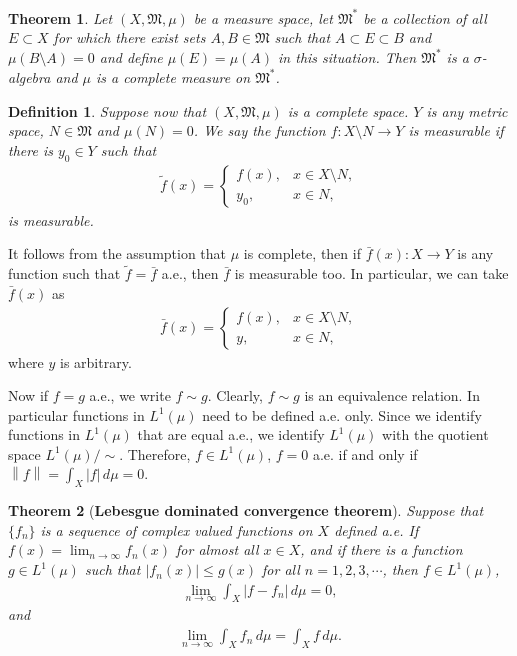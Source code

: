 \documentclass[11pt]{book}
\newtheorem{definition}{Definition}[chapter]
\newtheorem{theorem}{Theorem}[chapter]
\theoremstyle{definition}
\numberwithin{equation}{chapter}
\begin{document}
\medskip

\begin{theorem}{\rm \cite{2}}\label{theorem_218}
Let $(X,\mathfrak{M},\mu)$ be a measure space, let $\mathfrak{M}^*$ be a collection of all $E \subset X$ for which there exist sets $A, B \in \mathfrak{M}$ such that $A \subset E \subset B$ and $\mu(B\setminus A) = 0$ and define $\mu(E) = \mu(A)$ in this situation. Then $\mathfrak{M}^*$ is a $\sigma$-algebra and $\mu$ is a complete measure on $\mathfrak{M}^*$.
\end{theorem}

\medskip

\begin{definition}\label{def_210}
Suppose now that $(X,\mathfrak{M},\mu)$ is a complete space. $Y$ is any metric space, $N \in \mathfrak{M}$ and $\mu(N) = 0$. We say the function $f: X\setminus N \to Y$ is measurable if there is $y_0 \in Y$ such that
\begin{align*}
    \widetilde{f}(x) = \begin{cases}
        f(x), & x \in X \setminus N, \\
        y_0, & x \in N,
    \end{cases}
\end{align*}
is measurable. 
\end{definition}


It follows from the assumption that $\mu$ is complete, then if $\bar{f}(x): X \to Y$ is any function such that $\widetilde{f} = \bar{f}$ a.e., then $\bar{f}$ is measurable too. In particular, we can take $\bar{f}(x)$ as
\begin{align*}
    \bar{f}(x) = \begin{cases}
        f(x), & x \in X \setminus N, \\
        y, & x \in N,
    \end{cases}
\end{align*}
where $y$ is arbitrary.

Now if $f = g$ a.e., we write $f \sim g$. Clearly, $f \sim g$ is an equivalence relation. In particular functions in $L^1(\mu)$ need to be defined a.e. only. Since we identify functions in $L^1(\mu)$ that are equal a.e., we identify $L^1(\mu)$ with the quotient space $L^1(\mu)/\sim$. Therefore, $f \in L^1(\mu)$, $f = 0$ a.e. if and only if $\left\|f\right\| = \int_X|f|\,d\mu = 0$.

\medskip


\begin{theorem}[{\bf Lebesgue dominated convergence theorem}]\label{theorem_217}
Suppose that $\{f_n\}$ is a sequence of complex valued functions on $X$ defined a.e. If $f(x) = \lim_{n\to\infty} f_n(x)$ for almost all $x \in X$, and if there is a function $g \in L^1(\mu)$ such that $\left|f_n(x)\right| \leq g(x)$ for all $n = 1,2,3,\cdots$, then $f \in L^1(\mu)$,
\begin{align*}
    \lim_{n\to\infty} \int_X \left|f - f_n\right|\,d\mu = 0,
\end{align*}
and
\begin{align*}
    \lim_{n\to\infty} \int_X f_n\,d\mu = \int_X f\,d\mu.
\end{align*}
\end{theorem}
\end{document}
